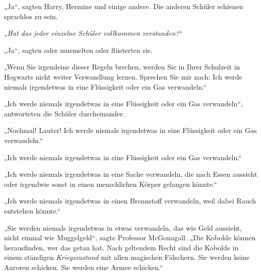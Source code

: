 „Ja“, sagten Harry, Hermine und einige andere. Die anderen Schüler schienen sprachlos zu sein.

„\emph{Hat das jeder einzelne Schüler vollkommen verstanden?}“

„Ja“, sagten oder murmelten oder flüsterten sie.

„Wenn Sie irgendeine dieser Regeln brechen, werden Sie in Ihrer Schulzeit in Hogwarts nicht weiter Verwandlung lernen. Sprechen Sie mir nach: Ich werde niemals irgendetwas in eine Flüssigkeit oder ein Gas verwandeln.“

„Ich werde niemals irgendetwas in eine Flüssigkeit oder ein Gas verwandeln“, antworteten die Schüler durcheinander.

„Nochmal! Lauter! Ich werde niemals irgendetwas in eine Flüssigkeit oder ein Gas verwandeln.“

„Ich werde niemals irgendetwas in eine Flüssigkeit oder ein Gas verwandeln.“

„Ich werde niemals irgendetwas in eine Sache verwandeln, die nach Essen aussieht oder irgendwie sonst in einen menschlichen Körper gelangen könnte.“

„Ich werde niemals irgendetwas in einen Brennstoff verwandeln, weil dabei Rauch entstehen könnte.“

„Sie werden niemals irgendetwas in etwas verwandeln, das wie Geld aussieht, nicht einmal wie Muggelgeld“, sagte Professor McGonagall. „Die Kobolde können herausfinden, wer das getan hat. Nach geltendem Recht sind die Kobolde in einem ständigen \emph{Kriegszustand} mit allen magischen Fälschern. Sie werden keine Auroren schicken. Sie werden eine Armee schicken.“

